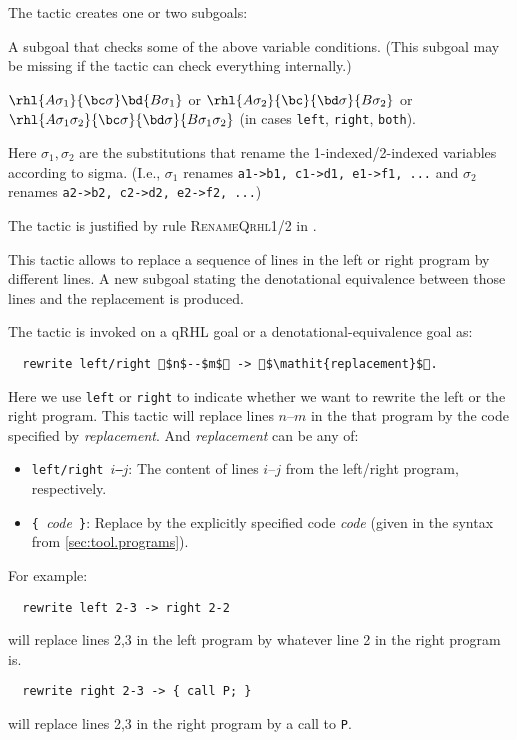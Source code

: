 \documentclass{article}
\renewcommand\ruleref[1]{rule \hbox{\textsc{#1}}}
\begin{document}
\medskip
\noindent
%
The tactic creates one or two subgoals:
\begin{compactitem}
\item A subgoal that checks some of the above variable
  conditions. (This subgoal may be missing if the tactic can check
  everything internally.)
\item $\rhl{A\sigma_1}{\bc\sigma}\bd{B\sigma_1}$
  or
  $\rhl{A\sigma_2}{\bc}{\bd\sigma}{B\sigma_2}$
  or
  $\rhl{A\sigma_1\sigma_2}{\bc\sigma}{\bd\sigma}{B\sigma_1\sigma_2}$
  (in cases \texttt{left}, \texttt{right}, \texttt{both}).
  
  Here $\sigma_1,\sigma_2$ are the substitutions that rename the
  1-indexed/2-indexed variables according to sigma. (I.e., $\sigma_1$
  renames \texttt{a1->b1, c1->d1, e1->f1, ...} and $\sigma_2$ renames
  \texttt{a2->b2, c2->d2, e2->f2, ...})
\end{compactitem}

\medskip
\noindent
The tactic is justified by \ruleref{RenameQrhl1/2} in
\cite{local-variables}.



This tactic allows to replace a sequence of lines in the left or right program by different lines.
A new subgoal stating the denotational equivalence between those lines and the replacement is produced.

The tactic is invoked on a qRHL goal or a denotational-equivalence goal as:
\begin{lstlisting}
  rewrite left/right $n$--$m$ -> $\mathit{replacement}$.
\end{lstlisting}
Here we use \texttt{left} or \texttt{right} to indicate whether we want to rewrite the left or the right program.
This tactic will replace lines $n$--$m$ in the that program by the code specified by \textit{replacement}.
And \textit{replacement} can be any of:
\begin{itemize}
\item \texttt{left/right $i$--$j$}: The content of lines $i$--$j$ from the left/right program, respectively.
\item \texttt{\{ }\textit{code}\texttt{ \}}: Replace by the explicitly specified code \textit{code} (given in the syntax from \autoref{sec:tool.programs}).
\end{itemize}

For example:
\begin{lstlisting}
  rewrite left 2-3 -> right 2-2
\end{lstlisting}
will replace lines 2,3 in the left program by whatever line 2 in the right program is.
\begin{lstlisting}
  rewrite right 2-3 -> { call P; }
\end{lstlisting}
will replace lines 2,3 in the right program by a call to \texttt{P}.
\end{document}
